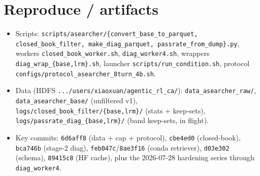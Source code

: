 \documentclass[10pt]{article}
\newcommand{\cmd}[1]{\texttt{\small #1}}
\begin{document}
\section{Reproduce / artifacts}
\begin{itemize}
\item Scripts: \cmd{scripts/asearcher/\{convert\_base\_to\_parquet, closed\_book\_filter,
make\_diag\_parquet, passrate\_from\_dump\}.py}, workers \cmd{closed\_book\_worker.sh},
\cmd{diag\_worker4.sh}, wrappers \cmd{diag\_wrap\_\{base,lrm\}.sh}, launcher
\cmd{scripts/run\_condition.sh}, protocol \cmd{configs/protocol\_asearcher\_8turn\_4b.sh}.
\item Data (HDFS \cmd{.../users/xiaoxuan/agentic\_rl\_ca/}): \cmd{data\_asearcher\_raw/},
\cmd{data\_asearcher\_base/} (unfiltered v1), \cmd{logs/closed\_book\_filter/\{base,lrm\}/}
(stats + keep-sets), \cmd{logs/passrate\_diag\_\{base,lrm\}/} (band keep-sets, in flight).
\item Key commits: \cmd{6d6aff8} (data + cap + protocol), \cmd{cbe4ed0} (closed-book),
\cmd{bca746b} (stage-2 diag), \cmd{feb047c}/\cmd{8ae3f16} (conda retriever), \cmd{d03e302} (schema),
\cmd{89415c8} (HF cache), plus the 2026-07-28 hardening series through \cmd{diag\_worker4}.
\end{itemize}
\end{document}
